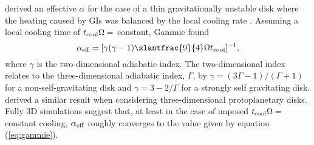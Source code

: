 \documentclass[manuscript]{aastex}
\begin{document}
\citet{gammie2001} derived an effective $\alpha$ for the case of a thin gravitationally unstable disk where the heating
caused by GIs was balanced by the local cooling rate \citep[see also][]{pringle1981}.  
Assuming a local cooling time of $t_{\rm cool}\Omega =$ constant,  Gammie found
\begin{equation}
\alpha_{\rm{eff}} = [\gamma(\gamma - 1) \slantfrac{9}{4}\Omega t_{\rm cool}]^{-1},
\label{eq:gammie}
\end{equation}
where $\gamma$ is the two-dimensional adiabatic index. 
The two-dimensional index relates
to the three-dimensional adiabatic index, $\Gamma$, by 
$\gamma = (3\Gamma - 1) / (\Gamma + 1)$
for a non-self-gravitating
disk and
$\gamma = 3 - 2/\Gamma $
for a strongly self gravitating disk.   \cite{lodato2004} derived a similar result when considering three-dimensional protoplanetary disks.
Fully 3D simulations \citep[e.g.,][]{lodato2004, cossins2009} suggest that, at least in the case of imposed 
$t_{\rm cool}\Omega = $ constant cooling, $\alpha_{\rm{eff}}$ roughly converges to the value given by equation (\ref{eq:gammie}). 
\end{document}
